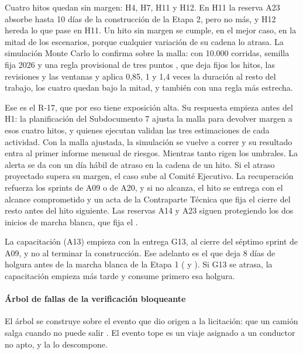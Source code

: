 Cuatro hitos quedan sin margen: H4, H7, H11 y H12. En H11 la reserva A23 absorbe hasta 10 días de la
construcción de la Etapa 2, pero no más, y H12 hereda lo que pase en H11. Un hito sin margen se cumple,
en el mejor caso, en la mitad de los escenarios, porque cualquier variación de su cadena lo atrasa. La
simulación Monte Carlo lo confirma sobre la malla: con 10.000 corridas, semilla fija 2026 y una regla
provisional de tres puntos \parencite{malcolm1959}, que deja fijos los hitos, las revisiones y las
ventanas y aplica 0,85, 1 y 1,4 veces la duración al resto del trabajo, los cuatro quedan bajo la mitad,
y también con una regla más estrecha.

Ese es el R-17, que por eso tiene exposición alta. Su respuesta empieza antes del H1: la planificación
del Subdocumento 7 ajusta la malla para devolver margen a esos cuatro hitos, y quienes ejecutan validan
las tres estimaciones de cada actividad. Con la malla ajustada, la simulación se vuelve a correr y su
resultado entra al primer informe mensual de riesgos. Mientras tanto rigen los umbrales. La alerta se da
con un día hábil de atraso en la cadena de un hito. Si el atraso proyectado supera su margen, el caso sube
al Comité Ejecutivo. La recuperación refuerza los sprints de A09 o de A20, y si no alcanza, el hito se
entrega con el alcance comprometido y un acta de la Contraparte Técnica que fija el cierre del resto antes
del hito siguiente. Las reservas A14 y A23 siguen protegiendo los dos inicios de marcha blanca, que fija
el .

La capacitación (A13) empieza con la entrega G13, al cierre del séptimo sprint de A09, y no al terminar la
construcción. Ese adelanto es el que deja 8 días de holgura antes de la marcha blanca de la Etapa 1
( y ). Si G13 se atrasa, la
capacitación empieza más tarde y consume primero esa holgura.

\paragraph{Árbol de fallas de la verificación bloqueante}
El árbol se construye sobre el evento que dio origen a la licitación: que un camión salga cuando no puede
salir . El evento tope es un viaje asignado a un conductor no apto, y la
 lo descompone.


